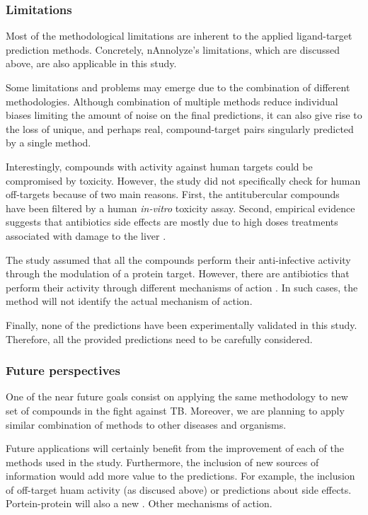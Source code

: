 \documentclass[12pt, b5paper,twoside]{tesi_upf}
\begin{document}
 
\subsubsection{Limitations} 

\par Most of the methodological limitations are inherent to the applied ligand-target prediction methods. Concretely, nAnnolyze's limitations, which are discussed above, are also applicable in this study.  

\par Some limitations and problems may emerge due to the combination of different methodologies. Although combination of multiple methods reduce individual biases limiting the amount of noise on the final predictions, it can also give rise to the loss of unique, and perhaps real, compound-target pairs singularly predicted by a single method.   

\par Interestingly, compounds with activity against human targets could be compromised by toxicity. However, the study did not specifically check for human off-targets because of two main reasons. First, the antitubercular compounds have been filtered by a human \textit{in-vitro} toxicity assay. Second, empirical evidence suggests that antibiotics side effects are mostly due to high doses treatments associated with damage to the liver \cite{Westphal1994}.

\par The study assumed that all the compounds perform their anti-infective activity through the modulation of a protein target. However, there are antibiotics that perform their activity through different mechanisms of action \cite{Ling2015a}. In such cases, the method will not identify the actual mechanism of action. 

\par Finally, none of the predictions have been experimentally validated in this study. Therefore, all the provided predictions need to be carefully considered. 
  


 \subsubsection{Future perspectives}

\par One of the near future goals consist on applying the same methodology to new set of compounds in the fight against TB. Moreover, we are planning to apply similar combination of methods to other diseases and organisms.   
\par Future applications will certainly benefit from the improvement of each of the methods used in the study. Furthermore, the inclusion of new sources of information would add more value to the predictions. For example, the inclusion of off-target huam activity (as discused above) or predictions about side effects. Portein-protein will also a new . Other mechanisms of action. 
\end{document}
